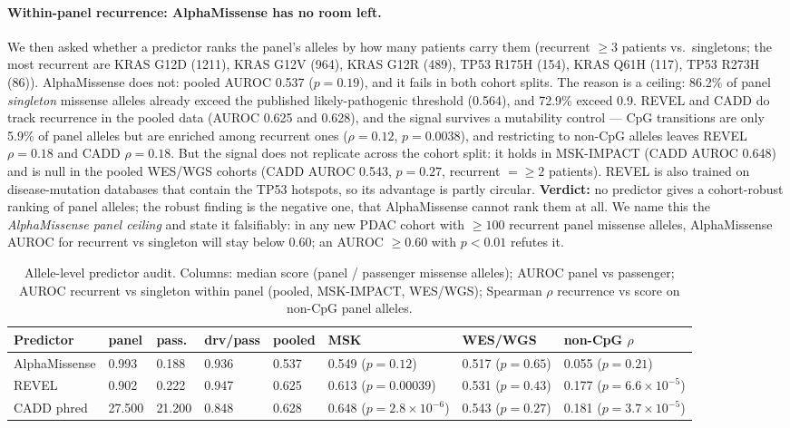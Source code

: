 \paragraph{Within-panel recurrence: AlphaMissense has no room left.} We then
asked whether a predictor ranks the panel's alleles by how many patients carry
them (recurrent $\ge3$ patients vs.\ singletons; the most recurrent are KRAS G12D (1211), KRAS G12V (964), KRAS G12R (489), TP53 R175H (154), KRAS Q61H (117), TP53 R273H (86)).
AlphaMissense does not: pooled AUROC 0.537 ($p=0.19$), and it fails in both
cohort splits. The reason is a ceiling: 86.2\% of panel \emph{singleton}
missense alleles already exceed the published likely-pathogenic threshold
(0.564), and 72.9\% exceed 0.9. REVEL and CADD do track recurrence in the
pooled data (AUROC 0.625 and 0.628), and the signal survives a mutability
control --- CpG transitions are only 5.9\% of panel alleles but are
enriched among recurrent ones ($\rho=0.12$, $p=0.0038$), and restricting to
non-CpG alleles leaves REVEL $\rho=0.18$ and CADD $\rho=0.18$. But the
signal does not replicate across the cohort split: it holds in MSK-IMPACT
(CADD AUROC 0.648) and is null in the pooled WES/WGS cohorts (CADD AUROC
0.543, $p=0.27$, recurrent $=\ge2$ patients). REVEL is also trained on
disease-mutation databases that contain the TP53 hotspots, so its advantage is
partly circular. \textbf{Verdict:} no predictor gives a cohort-robust ranking of
panel alleles; the robust finding is the negative one, that AlphaMissense
cannot rank them at all. We name this the \emph{AlphaMissense panel ceiling} and state it falsifiably: in any new PDAC cohort with $\ge100$ recurrent panel missense alleles, AlphaMissense AUROC for recurrent vs singleton will stay below 0.60; an AUROC $\ge0.60$ with $p<0.01$ refutes it.

\begin{table}[h]\centering\footnotesize
\caption{Allele-level predictor audit. Columns: median score (panel / passenger
missense alleles); AUROC panel vs passenger; AUROC recurrent vs singleton
within panel (pooled, MSK-IMPACT, WES/WGS); Spearman $\rho$ recurrence vs score
on non-CpG panel alleles.}\label{tab:myvariant}
\begin{tabular}{p{2.0cm}p{0.9cm}p{0.9cm}p{1.0cm}p{1.0cm}p{2.0cm}p{2.0cm}p{2.0cm}}
\hline
Predictor & panel & pass. & drv/pass & pooled & MSK & WES/WGS & non-CpG $\rho$ \\ \hline
AlphaMissense & 0.993 & 0.188 & 0.936 & 0.537 & 0.549 ($p=0.12$) & 0.517 ($p=0.65$) & 0.055 ($p=0.21$) \\
REVEL & 0.902 & 0.222 & 0.947 & 0.625 & 0.613 ($p=0.00039$) & 0.531 ($p=0.43$) & 0.177 ($p=6.6\times10^{-5}$) \\
CADD phred & 27.500 & 21.200 & 0.848 & 0.628 & 0.648 ($p=2.8\times10^{-6}$) & 0.543 ($p=0.27$) & 0.181 ($p=3.7\times10^{-5}$) \\
\hline\end{tabular}\end{table}

